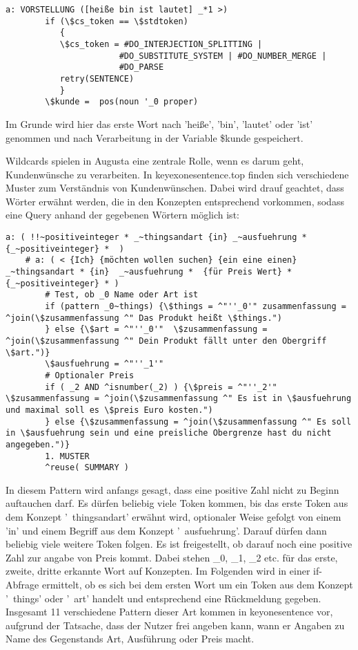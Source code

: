 \begin{lstlisting}[caption={Regel in introductions.top}]
a: VORSTELLUNG ([heiße bin ist lautet] _*1 >)
	    if (\$cs_token == \$stdtoken)
           {
           \$cs_token = #DO_INTERJECTION_SPLITTING |
                       #DO_SUBSTITUTE_SYSTEM | #DO_NUMBER_MERGE |
                       #DO_PARSE
           retry(SENTENCE)
           }
        \$kunde =  pos(noun '_0 proper)
\end{lstlisting}

Im Grunde wird hier das erste Wort nach 'heiße', 'bin', 'lautet' oder 'ist' genommen und nach Verarbeitung in der Variable \$kunde gespeichert. 

Wildcards spielen in Augusta eine zentrale Rolle, wenn es darum geht, Kundenwünsche zu verarbeiten. In keyexonesentence.top finden sich verschiedene Muster zum Verständnis von Kundenwünschen. Dabei wird drauf geachtet, dass Wörter erwähnt werden, die in den Konzepten entsprechend vorkommen, sodass eine Query anhand der gegebenen Wörtern möglich ist: 

\begin{lstlisting}[caption={Muster 1 in keyexonesentence.top}]
    a: ( !!~positiveinteger * _~thingsandart {in} _~ausfuehrung * {_~positiveinteger} *  )
    # a: ( < {Ich} {möchten wollen suchen} {ein eine einen} _~thingsandart * {in}  _~ausfuehrung *  {für Preis Wert} * {_~positiveinteger} * )
        # Test, ob _0 Name oder Art ist
        if (pattern _0~things) {\$things = ^"''_0'" zusammenfassung = ^join(\$zusammenfassung ^" Das Produkt heißt \$things.")
        } else {\$art = ^"''_0'"  \$zusammenfassung = ^join(\$zusammenfassung ^" Dein Produkt fällt unter den Obergriff \$art.")}
        \$ausfuehrung = ^"''_1'"
        # Optionaler Preis
        if ( _2 AND ^isnumber(_2) ) {\$preis = ^"''_2'" \$zusammenfassung = ^join(\$zusammenfassung ^" Es ist in \$ausfuehrung und maximal soll es \$preis Euro kosten.")
        } else {\$zusammenfassung = ^join(\$zusammenfassung ^" Es soll in \$ausfuehrung sein und eine preisliche Obergrenze hast du nicht angegeben.")}
        1. MUSTER
        ^reuse( SUMMARY )
\end{lstlisting}
        
In diesem Pattern wird anfangs gesagt, dass eine positive Zahl nicht zu Beginn auftauchen darf. Es dürfen beliebig viele Token kommen, bis das erste Token aus dem Konzept '~thingsandart' erwähnt wird, optionaler Weise gefolgt von einem 'in' und einem Begriff aus dem Konzept '~ausfuehrung'. Darauf dürfen dann beliebig viele weitere Token folgen. Es ist freigestellt, ob darauf noch eine positive Zahl zur angabe von Preis kommt. Dabei stehen \_0, \_1, \_2 etc. für das erste, zweite, dritte erkannte Wort auf Konzepten. Im Folgenden wird in einer if-Abfrage ermittelt, ob es sich bei dem ersten Wort um ein Token aus dem Konzept '~things' oder '~art' handelt und entsprechend eine Rückmeldung gegeben. 
Insgesamt 11 verschiedene Pattern dieser Art kommen in keyonesentence vor, aufgrund der Tatsache, dass der Nutzer frei angeben kann, wann er Angaben zu Name des Gegenstands Art, Ausführung oder Preis macht. 


